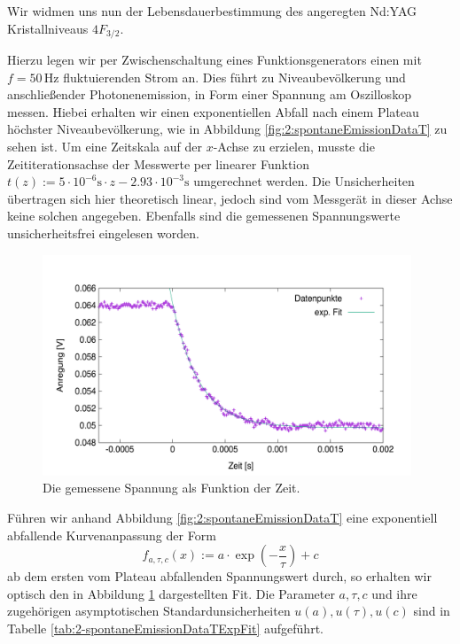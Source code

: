\documentclass[../../main.tex]{subfiles}
\begin{document}
    Wir widmen uns nun der Lebensdauerbestimmung des angeregten Nd:YAG Kristallniveaus $4F_{3/2}$. 

    Hierzu legen wir per Zwischenschaltung eines Funktionsgenerators einen mit $f = 50\,\si{\hertz}$ fluktuierenden Strom an. Dies führt zu Niveaubevölkerung und anschließender Photonenemission, in Form einer Spannung am Oszilloskop messen. Hiebei erhalten wir einen exponentiellen Abfall nach einem Plateau höchster Niveaubevölkerung, wie in Abbildung \ref{fig:2:spontaneEmissionDataT} zu sehen ist. Um eine Zeitskala auf der $x$-Achse zu erzielen, musste die Zeititerationsachse der Messwerte per linearer Funktion $t(z) := 5\cdot 10^{-6}\si{\s}\cdot z - 2.93\cdot 10^{-3}\si{\s}$ umgerechnet werden. Die Unsicherheiten übertragen sich hier theoretisch linear, jedoch sind vom Messgerät in dieser Achse keine solchen angegeben. Ebenfalls sind die gemessenen Spannungswerte unsicherheitsfrei eingelesen worden. 
    \begin{figure}[H]
        \centering
        \includegraphics[width=11cm]{../../Bilddateien/2/spontane_emission_data_t.png}
        \caption{Die gemessene Spannung als Funktion der Zeit.}
        \label{fig:2-spontaneEmissionDataT}
    \end{figure}
    Führen wir anhand Abbildung \ref{fig:2:spontaneEmissionDataT} eine exponentiell abfallende Kurvenanpassung der Form 
    \[
        f_{a,\tau,c}(x) := a\cdot \exp(-\frac{x}{\tau}) + c
    \]
    ab dem ersten vom Plateau abfallenden Spannungswert durch, so erhalten wir optisch den in Abbildung \ref{fig:2-spontaneEmissionDataT} dargestellten Fit. Die Parameter $a,\tau,c$ und ihre zugehörigen asymptotischen Standardunsicherheiten $u(a),u(\tau),u(c)$ sind in Tabelle \ref{tab:2-spontaneEmissionDataTExpFit} aufgeführt.
    
\end{document}
